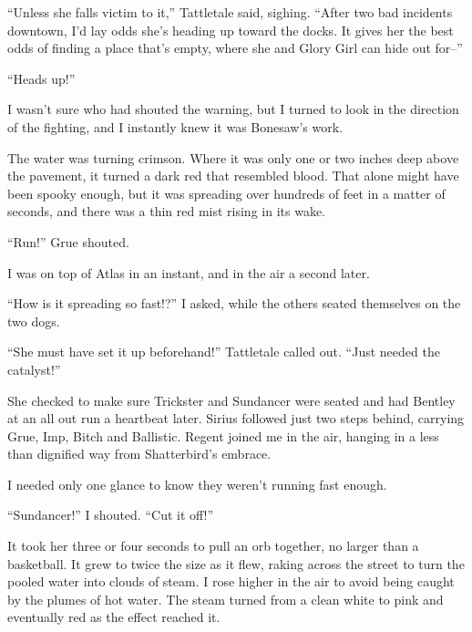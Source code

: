 ``Unless she falls victim to it,'' Tattletale said, sighing.  ``After two bad incidents downtown, I'd lay odds she's heading up toward the docks.  It gives her the best odds of finding a place that's empty, where she and Glory Girl can hide out for--''



``Heads up!''



I wasn't sure who had shouted the warning, but I turned to look in the direction of the fighting, and I instantly knew it was Bonesaw's work.



The water was turning crimson.  Where it was only one or two inches deep above the pavement, it turned a dark red that resembled blood.  That alone might have been spooky enough, but it was spreading over hundreds of feet in a matter of seconds, and there was a thin red mist rising in its wake.



``Run!''  Grue shouted.



I was on top of Atlas in an instant, and in the air a second later.



``How is it spreading so fast!?''  I asked, while the others seated themselves on the two dogs.



``She must have set it up beforehand!''  Tattletale called out.  ``Just needed the catalyst!''



She checked to make sure Trickster and Sundancer were seated and had Bentley at an all out run a heartbeat later.  Sirius followed just two steps behind, carrying Grue, Imp, Bitch and Ballistic.  Regent joined me in the air, hanging in a less than dignified way from Shatterbird's embrace.



I needed only one glance to know they weren't running fast enough.



``Sundancer!''  I shouted.  ``Cut it off!''



It took her three or four seconds to pull an orb together, no larger than a basketball.  It grew to twice the size as it flew, raking across the street to turn the pooled water into clouds of steam.  I rose higher in the air to avoid being caught by the plumes of hot water.  The steam turned from a clean white to pink and eventually red as the effect reached it.




